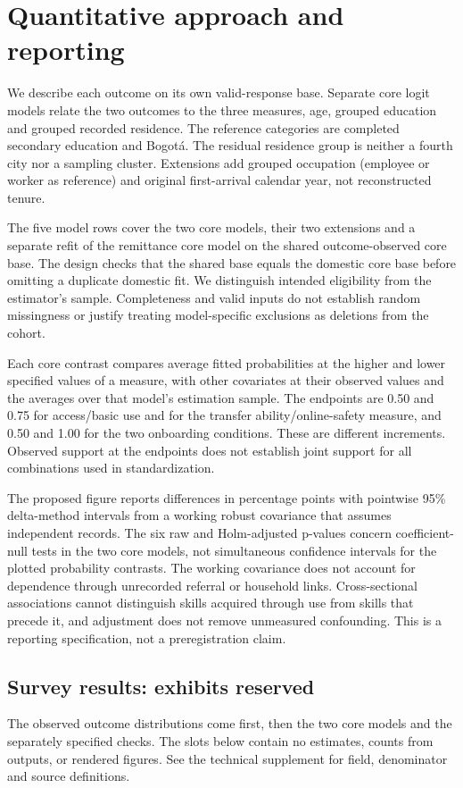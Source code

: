 \section{Quantitative approach and reporting}
We describe each outcome on its own valid-response base. Separate core logit models relate the two outcomes to the three measures, age, grouped education and grouped recorded residence. The reference categories are completed secondary education and Bogotá. The residual residence group is neither a fourth city nor a sampling cluster. Extensions add grouped occupation (employee or worker as reference) and original first-arrival calendar year, not reconstructed tenure.

The five model rows cover the two core models, their two extensions and a separate refit of the remittance core model on the shared outcome-observed core base. The design checks that the shared base equals the domestic core base before omitting a duplicate domestic fit. We distinguish intended eligibility from the estimator's sample. Completeness and valid inputs do not establish random missingness or justify treating model-specific exclusions as deletions from the cohort.

Each core contrast compares average fitted probabilities at the higher and lower specified values of a measure, with other covariates at their observed values and the averages over that model's estimation sample. The endpoints are 0.50 and 0.75 for access/basic use and for the transfer ability/online-safety measure, and 0.50 and 1.00 for the two onboarding conditions. These are different increments. Observed support at the endpoints does not establish joint support for all combinations used in standardization.

The proposed figure reports differences in percentage points with pointwise 95\% delta-method intervals from a working robust covariance that assumes independent records. The six raw and Holm-adjusted p-values concern coefficient-null tests in the two core models, not simultaneous confidence intervals for the plotted probability contrasts. The working covariance does not account for dependence through unrecorded referral or household links. Cross-sectional associations cannot distinguish skills acquired through use from skills that precede it, and adjustment does not remove unmeasured confounding. This is a reporting specification, not a preregistration claim.

\subsection{Survey results: exhibits reserved}
The observed outcome distributions come first, then the two core models and the separately specified checks. The slots below contain no estimates, counts from outputs, or rendered figures. See the technical supplement for field, denominator and source definitions.

